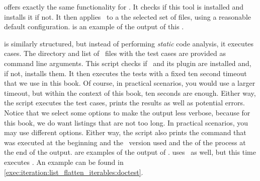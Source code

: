  offers exactly the same functionality for \pylint.
It checks if this tool is installed and installs it if not.
It then applies \pylint\ to a the selected set of files, using a reasonable default configuration.
 is an example of the output of this .

 is similarly structured, but instead of performing \emph{static} code analysis, it executes  cases.
The directory and list of \python\ files with the test cases are provided as command line arguments.
This script checks if \pytest\ and its plugin  are installed and, if not, installs them.
It then executes the tests with a fixed ten second timeout that we use in this book.
Of course, in practical scenarios, you would use a larger timeout, but within the context of this book, ten seconds are enough.
Either way, the script executes the test cases, prints the results as well as potential errors.
Notice that we select some options to make the output less verbose, because for this book, we do want listings that are not too long.
In practical scenarios, you may use different options.
Either way, the script also prints the command that was executed at the beginning and the \pytest\ version used and the  of the process at the end of the output.
 are examples of the output of \pytest.
 uses \pytest\ as well, but this time executes .
An example can be found in \cref{exec:iteration:list_flatten_iterables:doctest}.%
%
\endhsection%
%
